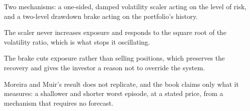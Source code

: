 \begin{keytakeaways}
\item Two mechanisms: a one-sided, damped volatility scaler acting on the
level of risk, and a two-level drawdown brake acting on the portfolio's
history.
\item The scaler never increases exposure and responds to the square root
of the volatility ratio, which is what stops it oscillating.
\item The brake cuts exposure rather than selling positions, which
preserves the recovery and gives the investor a reason not to override
the system.
\item Moreira and Muir's result does not replicate, and the book claims
only what it measures: a shallower and shorter worst episode, at a
stated price, from a mechanism that requires no forecast.
\end{keytakeaways}
